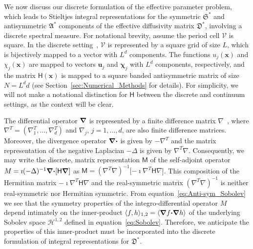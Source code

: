 \documentclass[english,12pt,jmp,graphicx]{revtex4-1}
\newcommand{\vecu}{\boldsymbol{u}}
\newcommand{\vecx}{\boldsymbol{x}}
\newcommand{\secref}[1]{Section~\ref{#1}}
\newcommand{\bnabla}{\mbox{\boldmath${\nabla}$}}
\newcommand{\bcdot}{\mbox{\boldmath${\cdot}$}}
\newcommand{\Vc}{\mathcal{V}}
\newcommand{\Sg}{\mathfrak{S}}
\newcommand{\Ag}{\mathfrak{A}}
\newcommand{\Dg}{\mathfrak{D}}
\newcommand{\Hs}{\mathscr{H}}
\newcommand{\vecchi}{\boldsymbol{\chi}}
\newcommand{\Hm}{\mathsf{H}}
\newcommand{\Mm}{\mathsf{M}}
\begin{document}
We now discuss our discrete formulation of the effective parameter problem,
which leads to Stieltjes integral representations for the symmetric
$\Sg^*$ and antisymmetric $\Ag^*$ components of the effective
diffusivity matrix $\Dg^*$, involving a discrete spectral measure. For
notational brevity, assume the period cell $\Vc$ is square. In the discrete
setting~\cite{Murphy:2015:CMS:13:4:825}, $\Vc$ is represented by a
square grid of size $L$, which is bijectively mapped to a vector with
$L^d$ components. The functions $u_j(\vecx)$ and
$\chi_j(\vecx)$ are mapped to vectors $\vecu_j$ and $\vecchi_j$
with $L^d$ components, respectively, and the matrix $\Hm(\vecx)$ is mapped
to a square banded antisymmetric matrix of size $N=L^dd$ (see
\secref{sec:Numerical_Methods} for details). For
simplicity, we will not make a notational distinction for $\Hm$
between the discrete and continuum settings, as the context will be
clear. 




The differential operator $\bnabla$ is
represented by a finite difference matrix
$\nabla$~\cite{Murphy:2015:CMS:13:4:825,Demmel:1997}, where 
$\nabla^T=(\nabla_1^T,\ldots,\nabla_d^T)$ and $\nabla_j$, $j=1,\ldots,d$, are also finite
difference matrices. Moreover, the divergence operator $\bnabla\bcdot$ 
is given by $-\nabla^T$ and the matrix representation of the negative
Laplacian $-\Delta$ is given by $\nabla^T\nabla$.
Consequently, we may write the  
discrete, matrix representation $\Mm$ of the self-adjoint operator
$M=\imath(-\Delta)^{-1}\bnabla\bcdot[\Hm\bnabla]$
as $\Mm=(\nabla^T\nabla)^{-1}[-\imath\nabla^T\Hm\nabla$].  This
composition of the Hermitian matrix $-\imath\nabla^T\Hm\nabla$ and the 
real-symmetric matrix $(\nabla^T\nabla)^{-1}$ is neither real-symmetric nor
Hermitian symmetric. From equation~\eqref{eq:Anti-sym_Sobolev} we see that the
symmetry properties of the integro-differential operator $M$ depend
intimately on the inner-product $\langle
f,h\rangle_{1,2}=\langle\bnabla f\bcdot\bnabla h\rangle$ of the
underlying Sobolev space $\Hs^{1,2}$ defined
in equation~\eqref{eq:Sobolev}. Therefore, we anticipate the properties of this 
inner-product must be incorporated into the discrete formulation of integral
representations for $\Dg^*$.
\end{document}
